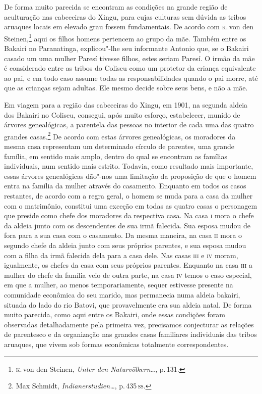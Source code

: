 De forma muito parecida se encontram as condições na grande região de
aculturação nas cabeceiras do Xingu, para cujas culturas sem dúvida as
tribos aruaques locais em elevado grau fossem fundamentais. De acordo com
\textsc{k}.\,von den Steinen,\footnote{\textsc{k}.\,von den Steinen, \textit{Unter den Naturvölkern\ldots}, p.\,131.} aqui os filhos homens
pertencem ao grupo da mãe. Também entre os Bakairi no Paranatinga,
explicou"-lhe seu informante Antonio que, se o Bakairi casado um uma
mulher Paresí tivesse filhos, estes seriam Paresí. O irmão da mãe é
considerado entre as tribos do Coliseu como um protetor da criança
equivalente ao pai, e em todo caso assume todas as responsabilidades
quando o pai morre, até que as crianças sejam adultas. Ele mesmo decide sobre
seus bens, e não a mãe.

Em viagem para a região das cabeceiras do Xingu, em 1901, na
segunda aldeia dos Bakairi no Coliseu, consegui, após muito esforço,
estabelecer, munido de árvores genealógicas, a parentela das pessoas no
interior de cada uma das quatro grandes casas.\footnote{Max Schmidt,
  \textit{Indianerstudien\ldots}, p.\,435\,\textsc{ss}.} De acordo com
estas árvores genealógicas, os moradores da mesma casa representam um
determinado círculo de parentes, uma grande família, em sentido mais
amplo, dentro do qual se encontram as famílias individuais, num sentido
mais estrito. Todavia, como resultado mais importante, essas árvores
genealógicas dão"-nos uma limitação da proposição de que o homem entra
na família da mulher através do casamento. Enquanto em todos os casos
restantes, de acordo com a regra geral, o homem se muda para a casa da
mulher com o matrimônio, constitui uma exceção em todas as quatro casas
o personagem que preside como chefe dos moradores da respectiva casa. Na
casa \textsc{i} mora o chefe da aldeia junto com os descendentes de sua irmã
falecida. Sua esposa mudou de fora para a sua casa com o casamento. Da
mesma maneira, na casa \textsc{ii} mora o segundo chefe da aldeia junto com seus
próprios parentes, e sua esposa mudou com a filha da irmã falecida dela
para a casa dele. Nas casas \textsc{iii} e \textsc{iv} moram, igualmente, os chefes da
casa com seus próprios parentes. Enquanto na casa \textsc{iii} a mulher do chefe
da família veio de outra parte, na casa \textsc{iv} temos o caso especial, em que
a mulher, ao menos temporariamente, sequer estivesse presente na
comunidade econômica do seu marido, mas permanecia numa aldeia bakairi,
situada do lado do rio Batovi, que provavelmente era sua aldeia natal.
De forma muito parecida, como aqui entre os Bakairi, onde essas
condições foram observadas detalhadamente pela primeira vez, precisamos
conjecturar as relações de parentesco e da organização nas grandes casas
familiares individuais das tribos aruaques, que vivem sob formas
econômicas totalmente correspondentes. 

